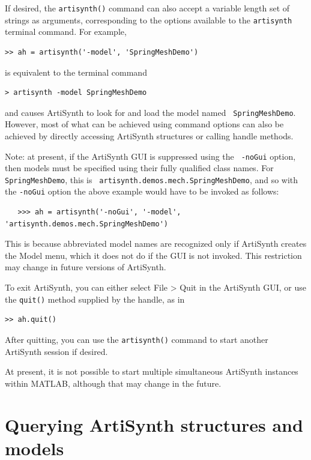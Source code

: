\documentclass{article}
\begin{document}
If desired, the {\tt artisynth()} command can also accept a variable
length set of strings as arguments, corresponding to the
options available to the {\tt artisynth} terminal command.  For
example,
%
\begin{lstlisting}[]
  >> ah = artisynth('-model', 'SpringMeshDemo')
\end{lstlisting}
%
is equivalent to the terminal command
%
\begin{lstlisting}[]
  > artisynth -model SpringMeshDemo
\end{lstlisting}
%
and causes ArtiSynth to look for and load the model named {\tt
SpringMeshDemo}. However, most of what can be achieved using command
options can also be achieved by directly accessing ArtiSynth
structures or calling handle methods.

%
\begin{sideblock}
Note: at present, if the ArtiSynth GUI is suppressed using the {\tt
-noGui} option, then models must be specified using their fully
qualified class names. For {\tt SpringMeshDemo}, this is {\tt
artisynth.demos.mech.SpringMeshDemo}, and so with the {\tt -noGui}
option the above example would have to be invoked as follows:
%
\begin{verbatim}
   >>> ah = artisynth('-noGui', '-model', 'artisynth.demos.mech.SpringMeshDemo')
\end{verbatim}
%
This is because abbreviated model names are recognized only if
ArtiSynth creates the {\sf Model} menu, which it does not do if the
GUI is not invoked. This restriction may change in future versions of
ArtiSynth.
\end{sideblock}
%

To exit ArtiSynth, you can either select {\sf File > Quit} in the
ArtiSynth GUI, or use the {\tt quit()} method supplied by the handle,
as in
%
\begin{lstlisting}[]
  >> ah.quit()
\end{lstlisting}
%

After quitting, you can use the {\tt artisynth()} command to start
another ArtiSynth session if desired.

\begin{sideblock}
At present, it is not possible to start multiple simultaneous
ArtiSynth instances within MATLAB, although that may change in the
future.
\end{sideblock}

\section{Querying ArtiSynth structures and models}
\label{MatlabQuerying:sec}
\end{document}
